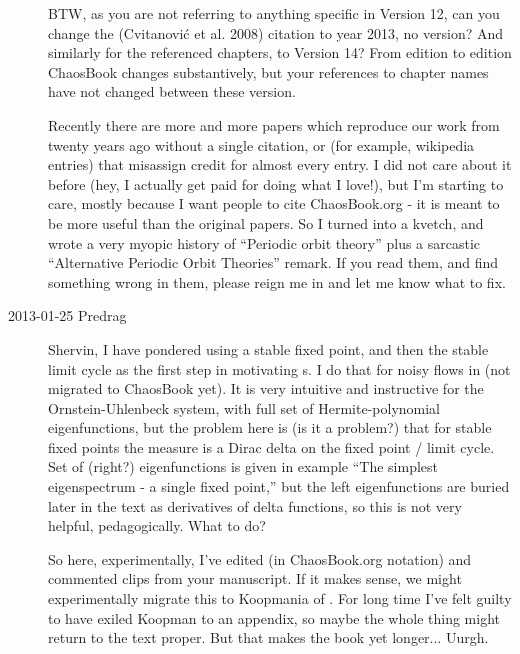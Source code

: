 \begin{description}
BTW, as you are not referring to anything specific in Version 12, can
you change the (Cvitanovi\'c et al. 2008) citation to year 2013, no
version? And similarly for the referenced chapters, to Version 14?
From edition to edition ChaosBook changes substantively, but your
references to chapter names have not changed between these version.

Recently there are more and more papers which reproduce our work from
twenty years ago without a single citation, or (for example,
wikipedia entries) that misassign credit for almost every entry. I
did not care about it before (hey, I actually get paid for doing what
I love!), but I'm starting to care, mostly because I want people to
cite ChaosBook.org - it is meant to be more useful than the original
papers. So I turned into a kvetch, and wrote a very myopic history of
 {``Periodic orbit theory''} plus a
sarcastic  {``Alternative Periodic Orbit
Theories''} remark. If you read them, and find something wrong in
them, please reign me in and let me know what to fix.

\item[2013-01-25 Predrag] Shervin, I have pondered using a stable
fixed point, and then the stable limit cycle as the first step in
motivating \Fd s. I do that for noisy flows in
 (not migrated to ChaosBook yet). It is
very intuitive and instructive for the Ornstein-Uhlenbeck system,
with full set of Hermite-polynomial eigenfunctions, but the problem
here is (is it a problem?) that for stable fixed points the measure
is a Dirac delta on the fixed point / limit cycle. Set of (right?)
eigenfunctions is given in  example ``The simplest
eigenspectrum - a single fixed point,'' but the left eigenfunctions
are buried later in the text as derivatives of delta functions, so
this is not very helpful, pedagogically. What to do?

So here, experimentally, I've edited (in ChaosBook.org notation) and
commented clips from your manuscript. If it makes
sense, we might experimentally migrate this to Koopmania of
. For long time I've felt guilty
to have exiled Koopman to an appendix, so maybe the whole thing might
return to the text proper. But that makes the book yet longer...
Uurgh.

\newcommand{\Ubf}{{\bf\mathbf{U}}}
\newcommand{\Mbf}{{\bf\mathbf{M}}}
\newcommand{\Ibf}{{\bf\mathbf{I}}}
\newcommand{\fb}{{\bf f}}
\newcommand{\jb}{{\boldsymbol j}}
\newcommand{\df}[2]{\frac{\partial #1}{\partial #2}}



\end{description}
